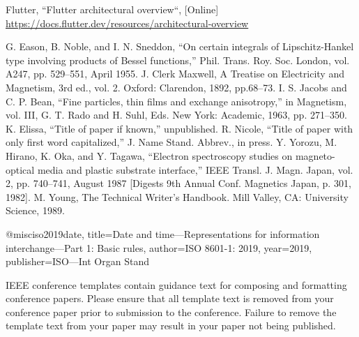 \documentclass[conference]{IEEEtran}
\begin{document}
\begin{thebibliography}{00}
 Flutter, ``Flutter architectural overview``, [Online] \url{https://docs.flutter.dev/resources/architectural-overview}
	
 G. Eason, B. Noble, and I. N. Sneddon, ``On certain integrals of Lipschitz-Hankel type involving products of Bessel functions,'' Phil. Trans. Roy. Soc. London, vol. A247, pp. 529--551, April 1955.
 J. Clerk Maxwell, A Treatise on Electricity and Magnetism, 3rd ed., vol. 2. Oxford: Clarendon, 1892, pp.68--73.
 I. S. Jacobs and C. P. Bean, ``Fine particles, thin films and exchange anisotropy,'' in Magnetism, vol. III, G. T. Rado and H. Suhl, Eds. New York: Academic, 1963, pp. 271--350.
 K. Elissa, ``Title of paper if known,'' unpublished.
 R. Nicole, ``Title of paper with only first word capitalized,'' J. Name Stand. Abbrev., in press.
 Y. Yorozu, M. Hirano, K. Oka, and Y. Tagawa, ``Electron spectroscopy studies on magneto-optical media and plastic substrate interface,'' IEEE Transl. J. Magn. Japan, vol. 2, pp. 740--741, August 1987 [Digests 9th Annual Conf. Magnetics Japan, p. 301, 1982].
 M. Young, The Technical Writer's Handbook. Mill Valley, CA: University Science, 1989.

@misc{iso2019date,
  title={Date and time—Representations for information interchange—Part 1: Basic rules},
  author={ISO 8601-1: 2019},
  year={2019},
  publisher={ISO—Int Organ Stand}
}

\end{thebibliography}
\vspace{12pt}
\color{red}
IEEE conference templates contain guidance text for composing and formatting conference papers. Please ensure that all template text is removed from your conference paper prior to submission to the conference. Failure to remove the template text from your paper may result in your paper not being published.
\end{document}
